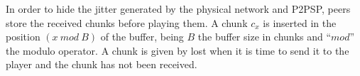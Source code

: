 In order to hide the jitter generated by the physical network and
P2PSP, peers store the received chunks before playing them. A chunk
$c_x$ is inserted in the position $(x~\mathit{mod}~B)$ of the buffer,
being $B$ the buffer size in chunks and ``$\mathit{mod}$'' the modulo
operator. A chunk is given by lost when it is time to send it to the
player and the chunk has not been received.
